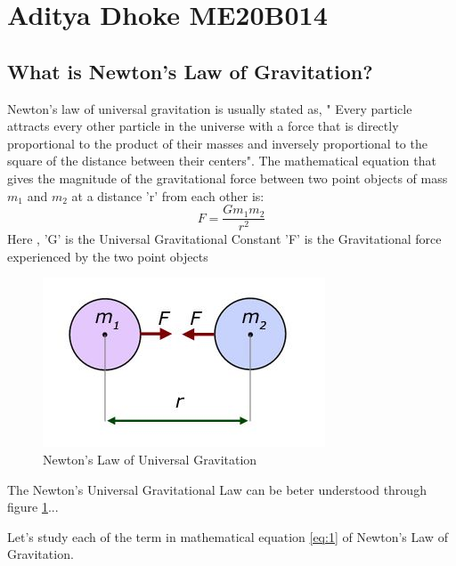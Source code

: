 \documentclass[a4paper, 12pt]{article}
\begin{document}
\section*{Aditya Dhoke ME20B014}
\subsection*{What is Newton's Law of Gravitation?}  
Newton's law of universal gravitation is usually stated as, " Every particle attracts every other particle in the universe with a force that is directly proportional to the product of their masses and inversely proportional to the square of the distance between their centers".
   The mathematical equation that gives the magnitude of the gravitational force between two point objects of mass  $ m_1 $ and $ m_2 $ at a distance 'r' from each other is:
   \begin{equation} \label{eq:1}
         F = \frac{Gm_1m_2}{r^2}
   \end{equation}
   Here , 'G' is the Universal Gravitational Constant 
          'F' is the Gravitational force experienced by the two point objects \par
          \begin{figure}[h]
          \begin{center}
          \includegraphics[scale=1,natwidth=317,natheight=190]{me20b014.jpg} 
          \end{center}
          \caption{Newton's Law of Universal Gravitation}
          \label{fig1}
          \end{figure}
The Newton's Universal Gravitational Law can be beter understood through figure \ref{fig1}... \par
 Let's study each of the term in mathematical equation \ref{eq:1} of Newton's Law of Gravitation.
\end{document}
